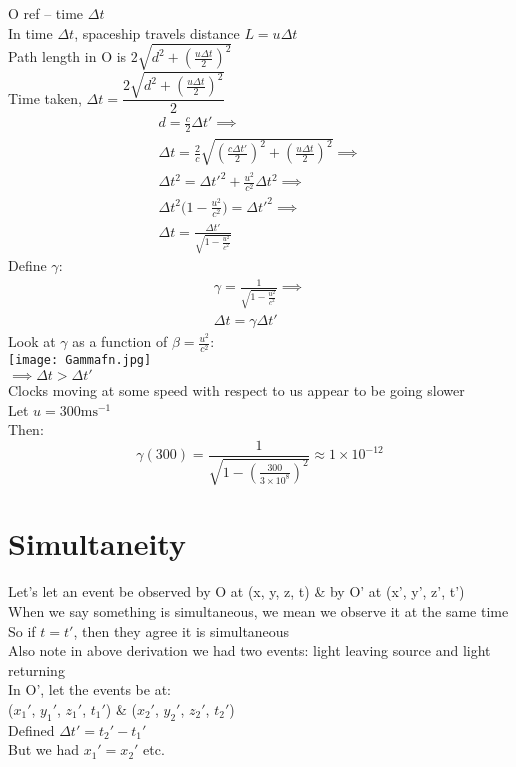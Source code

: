\documentclass[a4paper, 11pt, fleqn, normalem]{report}
\begin{document}
O ref -- time $\Delta t$ \\
In time $\Delta t$, spaceship travels distance $L = u\Delta t$ \\
Path length in O is $2\sqrt{d^{2} + (\frac{u\Delta t}{2})^{2}}$ \\
Time taken, $\Delta t = \dfrac{2\sqrt{d^{2} + (\frac{u\Delta t}{2})^{2}}}{2}$
\begin{gather*}
    d = \frac{c}{2}\Delta t' \implies \\
    \Delta t = \frac{2}{c}\sqrt{(\frac{c\Delta t'}{2})^{2} + (\frac{u\Delta t}{2})^{2}} \implies \\
    \Delta t^{2} = \Delta t'^{2} + \frac{u^{2}}{c^{2}}\Delta t^{2} \implies \\
    \Delta t^{2}\Big(1 - \frac{u^{2}}{c^{2}}\Big) = \Delta t'^{2} \implies \\
    \Delta t = \frac{\Delta t'}{\sqrt{1 - \tfrac{u^{2}}{c^{2}}}}
\end{gather*}
Define $\gamma$:
\begin{gather*}
    \gamma = \frac{1}{\sqrt{1 - \tfrac{u^{2}}{c^{2}}}} \implies \\
    \Delta t = \gamma\Delta t'
\end{gather*}
Look at $\gamma$ as a function of $\beta = \frac{u^{2}}{c^{2}}$: \\
\texttt{[image: Gammafn.jpg]} \\
$\implies \Delta t > \Delta t'$ \\
Clocks moving at some speed with respect to us appear to be going slower \\
Let $u = 300\text{ms}^{-1}$ \\
Then:
\begin{equation*}
    \gamma(300) = \frac{1}{\sqrt{1 - (\tfrac{300}{3\times10^{8}})^{2}}} \approx 1\times10^{-12}
\end{equation*}

\section{Simultaneity}
Let's let an event be observed by O at (x, y, z, t) \& by O' at (x', y', z', t') \\
When we say something is simultaneous, we mean we observe it at the same time \\
So if $t = t'$, then they agree it is simultaneous \\
Also note in above derivation we had two events: light leaving source and light returning \\
In O', let the events be at: \\
($x_{1}'$, $y_{1}'$, $z_{1}'$, $t_{1}'$) \& ($x_{2}'$, $y_{2}'$, $z_{2}'$, $t_{2}'$) \\
Defined $\Delta t' = t_{2}' - t_{1}'$ \\
But we had $x_{1}' = x_{2}'$ etc.
\end{document}
